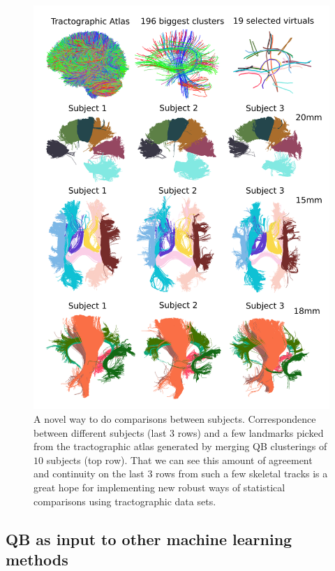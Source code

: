 \documentclass[preprint,authoryear,a4paper,10pt,onecolumn]{elsarticle}
\begin{document}
%
\begin{figure}
\begin{centering}
\includegraphics[scale=0.7]{last_figures/close_distance}
\par\end{centering}
\caption{A novel way to do comparisons between subjects. Correspondence
  between different subjects (last $3$ rows) and a few landmarks picked
  from the tractographic atlas generated by merging QB clusterings of
  $10$ subjects (top row). That we can see this amount of agreement and
  continuity on the last $3$ rows from such a few skeletal tracks is a
  great hope for implementing new robust ways of statistical comparisons
  using tractographic data sets.\label{Flo:CloseToSelected}}
\end{figure}

\subsection{QB as input to other machine learning methods}
\end{document}
